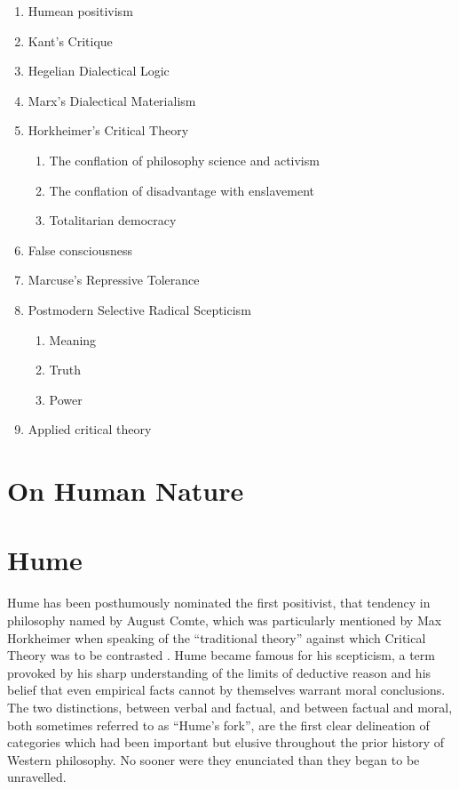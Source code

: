 \documentclass[10pt,titlepage]{article}
\begin{document}
{\begin{enumerate}
\item Humean positivism
\item Kant's Critique
\item Hegelian Dialectical Logic
\item Marx's Dialectical Materialism
\item Horkheimer's Critical Theory
  \begin{enumerate}
  \item The conflation of philosophy science and activism
  \item The conflation of disadvantage with enslavement
  \item Totalitarian democracy
  \end{enumerate}
  \item False consciousness
\item Marcuse's Repressive Tolerance
\item Postmodern Selective Radical Scepticism
  \begin{enumerate}
  \item Meaning
  \item Truth
  \item Power
    \end{enumerate}
\item Applied critical theory
\end{enumerate}

}%

\section{On Human Nature}

\section{Hume}

Hume has been posthumously nominated the first positivist, that tendency in philosophy named by August Comte, which was particularly mentioned by Max Horkheimer when speaking of the ``traditional theory'' against which Critical Theory was to be contrasted \cite{horkheimer-trad}.
Hume became famous for his scepticism, a term provoked by his sharp understanding of the limits of deductive reason and his belief that even empirical facts cannot by themselves warrant moral conclusions.
The two distinctions, between verbal and factual, and between factual and moral, both sometimes referred to as ``Hume's fork'', are the first clear delineation of categories which had been important but elusive throughout the prior history of Western philosophy.
No sooner were they enunciated than they began to be unravelled.
\end{document}
